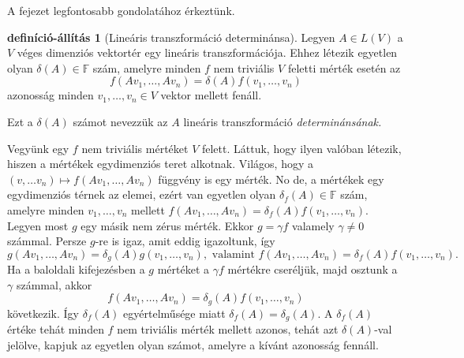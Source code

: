 \documentclass[9pt, a4paper, showtrims]{memoir}
\makeatletter
\renewenvironment{proof}[1][\proofname]
    {\par\pushQED{\qed}%
    \normalfont \topsep6\p@\@plus6\p@\relax
    \trivlist
    \item[\hskip\labelsep
        \itshape
    #1\@addpunct{:}]\ignorespaces}
    {\popQED\endtrivlist\@endpefalse}
\theoremstyle{plain}
\theoremstyle{remark}
\theoremstyle{definition}
\newtheorem{defprop}[proposition]{definíció-állítás}
\makeatother
\begin{document}
A fejezet legfontosabb gondolatához érkeztünk.
\begin{defprop}[Lineáris transzformáció determinánsa]
    Legyen $A\in L\left( V \right)$ a $V$ véges dimenziós vektortér egy lineáris transzformációja.
    Ehhez létezik egyetlen olyan $\delta\left( A \right)\in\mathbb{F}$ szám,
    amelyre minden $f$ nem triviális $V$ feletti mérték esetén az 
    \[
        f\left( Av_1,\dots,Av_n \right)
        =
        \delta\left( A \right)
        f\left( v_1,\dots,v_n \right)
    \]
    azonosság minden $v_1,\dots,v_n\in V$ vektor mellett fenáll.

    Ezt a $\delta\left( A \right)$ számot nevezzük az $A$ lineáris transzformáció \emph{determinánsának.}
\end{defprop}
\begin{proof}
    Vegyünk egy $f$ nem triviális mértéket $V$ felett. 
    Láttuk, hogy ilyen valóban létezik, hiszen a mértékek egydimenziós teret alkotnak.
    Világos, hogy a $\left( v,\ldots v_{n}\right) \mapsto f\left( Av_{1},\ldots ,Av_{n}\right) $ 
    függvény is egy mérték. 
    No de, a mértékek egy egydimenziós térnek az elemei, 
    ezért van egyetlen olyan $\delta _{f}\left( A\right)\in\mathbb{F} $ szám,
    amelyre minden 
    $
    v_{1},\ldots ,v_{n}
    $ 
    mellett 
    $
    f\left( Av_{1},\ldots,Av_{n}\right) 
    =
    \delta _{f}\left( A\right) f\left( v_{1},\ldots,v_{n}\right)
    $.
    Legyen most $g$ egy másik nem zérus mérték. 
    Ekkor 
    $g=\gamma f$ valamely $\gamma\neq 0$ számmal. 
    Persze $g$-re is igaz, amit eddig igazoltunk,
    így
    \begin{displaymath}
        g\left( Av_{1},\ldots ,Av_{n}\right) 
        =
        \delta_{g}\left( A\right) g\left( v_{1},\ldots ,v_{n}\right),
        \text{ valamint }
        f\left( Av_{1},\ldots,Av_{n}\right) 
        =
        \delta _{f}\left( A\right) f\left( v_{1},\ldots,v_{n}\right).
    \end{displaymath}
    Ha a baloldali kifejezésben a $g$ mértéket a $\gamma f$ mértékre cseréljük, 
    majd osztunk a $\gamma$ számmal, 
    akkor
    \[
    f\left(Av_{1},\ldots ,Av_{n}\right) 
    =
    \delta _{g}\left( A\right) f\left(v_{1},\ldots ,v_{n}\right)
    \]
    következik. 
    Így $\delta _{f}\left( A\right) $ egyértelműsége miatt
    $
    \delta _{f}\left( A\right) =\delta _{g}\left( A\right). 
    $ 
    A $\delta_f\left( A \right)$ értéke tehát minden $f$ nem triviális mérték mellett azonos,
    tehát azt $\delta(A)$-val jelölve, kapjuk az egyetlen olyan számot, 
    amelyre a kívánt azonosság fennáll.
\end{proof}
\end{document}
